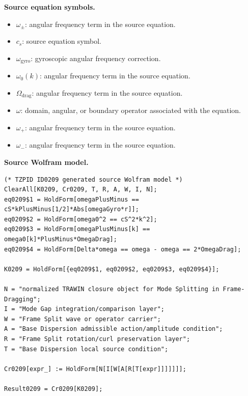 \begin{minipage}[t]{0.49\linewidth}
\begingroup
\small
\raggedright
\textbf{Source equation symbols.}\par
\begin{itemize}[leftmargin=1.35em,itemsep=1pt,topsep=1pt,parsep=0pt]
    \item $\omega_{\pm}$: angular frequency term in the source equation.
    \item $c_s$: source equation symbol.
    \item $\omega_{\mathrm{gyro}}$: gyroscopic angular frequency correction.
    \item $\omega_0(k)$: angular frequency term in the source equation.
    \item $\Omega_{\mathrm{drag}}$: angular frequency term in the source equation.
    \item $\omega$: domain, angular, or boundary operator associated with the equation.
    \item $\omega_{+}$: angular frequency term in the source equation.
    \item $\omega_{-}$: angular frequency term in the source equation.
\end{itemize}
\endgroup
\end{minipage}\hfill
\begin{minipage}[t]{0.47\linewidth}
\begingroup
\scriptsize
\raggedright
\textbf{Source Wolfram model.}\par
\begin{Verbatim}[fontsize=\tiny,breaklines=true,breakanywhere=true]
(* TZPID ID0209 generated source Wolfram model *)
ClearAll[K0209, Cr0209, T, R, A, W, I, N];
eq0209$1 = HoldForm[omegaPlusMinus == cS*kPlusMinus[1/2]*Abs[omegaGyro*r]];
eq0209$2 = HoldForm[omega0^2 == cS^2*k^2];
eq0209$3 = HoldForm[omegaPlusMinus[k] == omega0[k]*PlusMinus*OmegaDrag];
eq0209$4 = HoldForm[Delta*omega == omega - omega == 2*OmegaDrag];

K0209 = HoldForm[{eq0209$1, eq0209$2, eq0209$3, eq0209$4}];

N = "normalized TRAWIN closure object for Mode Splitting in Frame-Dragging";
I = "Mode Gap integration/comparison layer";
W = "Frame Split wave or operator carrier";
A = "Base Dispersion admissible action/amplitude condition";
R = "Frame Split rotation/curl preservation layer";
T = "Base Dispersion local source condition";

Cr0209[expr_] := HoldForm[N[I[W[A[R[T[expr]]]]]]];

Result0209 = Cr0209[K0209];
\end{Verbatim}
\endgroup
\end{minipage}

